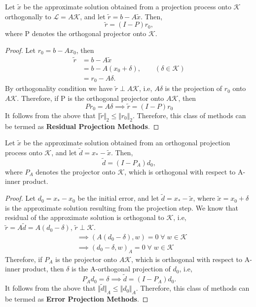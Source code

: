 \documentclass[10pt,a4paper]{article}
\begin{document}
\begin{proposition}
Let $\tilde{x}$ be the approximate solution obtained from a projection process onto $\mathcal{K}$ orthogonally to $\mathcal{L}=A\mathcal{K}$, and let $\tilde{r} = b-A\tilde{x}$. Then,
$$\tilde{r}=(I-P)r_0,$$
where P denotes the orthogonal projector onto $\mathcal{K}$.
\end{proposition}

\begin{proof}
Let $r_0=b-Ax_0$, then
\begin{align*}
\tilde{r} &= b-A\tilde{x}\\
&= b-A(x_0+\delta),\qquad(\delta\in\mathcal{K})\\
&= r_0-A\delta.
\end{align*}
By orthogonality condition we have $\tilde{r}\perp A\mathcal{K}$, i.e, $A\delta$ is the projection of $r_0$ onto $A\mathcal{K}$. Therefore, if P is the orthogonal projector onto $A\mathcal{K}$, then
$$Pr_0=A\delta \implies \tilde{r}=(I-P)r_0$$
It follows from the above that $\Vert \tilde{r}\Vert_2 \le \Vert r_0\Vert_2.$ Therefore, this class of methods can be termed as \textbf{Residual Projection Methods}.
\end{proof}

\begin{proposition}
Let $\tilde{x}$ be the approximate solution obtained from an orthogonal projection process onto $\mathcal{K}$, and let $\tilde{d} = x_*-\tilde{x}$. Then,
$$\tilde{d}=(I-P_A)d_0,$$
where $P_A$ denotes the projector onto $\mathcal{K}$, which is orthogonal with respect to A-inner product.
\end{proposition}

\begin{proof}
Let $d_0=x_*-x_0$ be the initial error, and let $\tilde{d}=x_*-\tilde{x}$, where $\tilde{x}=x_0+\delta$ is the approximate solution resulting from the projection step. We know that residual of the approximate solution is orthogonal to $\mathcal{K}$, i.e, $\tilde{r}=A\tilde{d}=A(d_0-\delta)$, $\tilde{r}\perp \mathcal{K}$.
\begin{align*}
&\implies (A(d_0-\delta),w)=0\;\forall\;w\in\mathcal{K} \\
&\implies (d_0-\delta,w)_A=0\;\forall\;w\in\mathcal{K}
\end{align*}
Therefore, if $P_A$ is the projector onto $A\mathcal{K}$, which is orthogonal with respect to A-inner product, then $\delta$ is the A-orthogonal projection of $d_0$, i.e,
$$P_Ad_0=\delta \implies \tilde{d}=(I-P_A)d_0.$$
It follows from the above that $\Vert \tilde{d}\Vert_A \le \Vert d_0\Vert_A.$ Therefore, this class of methods can be termed as \textbf{Error Projection Methods}.
\end{proof}
\end{document}
